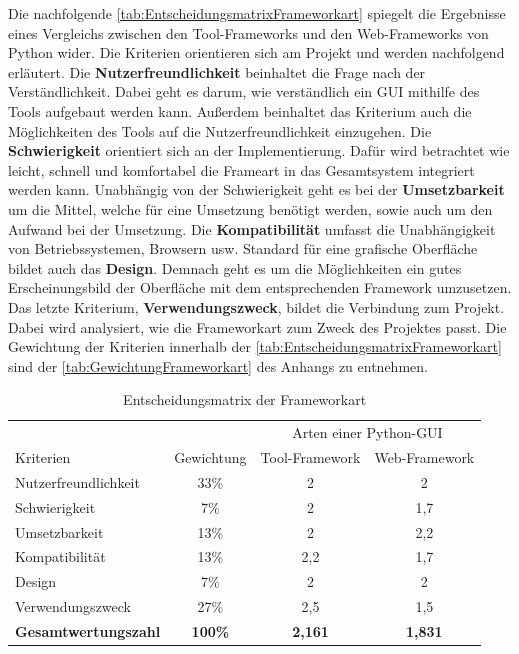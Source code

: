 \documentclass[a4paper,titlepage,halfparskip,12pt]{scrreprt}
\begin{document}
\begin{onehalfspacing}
Die nachfolgende \autoref{tab:EntscheidungsmatrixFrameworkart} spiegelt die Ergebnisse eines Vergleichs zwischen den Tool-Frameworks und den Web-Frameworks von Python wider. Die Kriterien orientieren sich am Projekt und werden nachfolgend erläutert. Die \textbf{Nutzerfreundlichkeit} beinhaltet die Frage nach der Verständlichkeit. Dabei geht es darum, wie verständlich ein GUI mithilfe des Tools aufgebaut werden kann. Außerdem beinhaltet das Kriterium auch die Möglichkeiten des Tools auf die Nutzerfreundlichkeit einzugehen. Die \textbf{Schwierigkeit} orientiert sich an der Implementierung. Dafür wird betrachtet wie leicht, schnell und komfortabel die Frameart in das Gesamtsystem integriert werden kann. Unabhängig von der Schwierigkeit geht es bei der \textbf{Umsetzbarkeit} um die Mittel, welche für eine Umsetzung benötigt werden, sowie auch um den Aufwand bei der Umsetzung. Die \textbf{Kompatibilität} umfasst die Unabhängigkeit von Betriebssystemen, Browsern usw. Standard für eine grafische Oberfläche bildet auch das \textbf{Design}. Demnach geht es um die Möglichkeiten ein gutes Erscheinungsbild der Oberfläche mit dem entsprechenden Framework umzusetzen. Das letzte Kriterium, \textbf{Verwendungszweck}, bildet die Verbindung zum Projekt. Dabei wird analysiert, wie die Frameworkart zum Zweck des Projektes passt. Die Gewichtung der Kriterien innerhalb der \autoref{tab:EntscheidungsmatrixFrameworkart} sind der \autoref{tab:GewichtungFrameworkart} des Anhangs zu entnehmen.
\renewcommand{\arraystretch}{2}
\begin{table}[h]
	\centering
	\caption{Entscheidungsmatrix der Frameworkart}
	\begin{tabular}{l|c|c|c}
		& & \multicolumn{2}{c}{Arten einer Python-GUI} \\
		Kriterien & Gewichtung & Tool-Framework & Web-Framework \\
		\hline
		Nutzerfreundlichkeit & 33\% & 2 & 2 \\
		\hline
		Schwierigkeit & 7\% & 2 & 1,7  \\
		\hline
		Umsetzbarkeit & 13\% & 2 & 2,2\\
		\hline
		Kompatibilität & 13\% & 2,2 & 1,7 \\
		\hline
		Design & 7\% & 2 &  2\\
		\hline 
		Verwendungszweck & 27\% & 2,5 & 1,5 \\
		\hline
		\textbf{Gesamtwertungszahl} & \textbf{100\%} & \textbf{2,161} & \textbf{1,831} \\
	\end{tabular}

\end{table}
\end{onehalfspacing}
\end{document}
